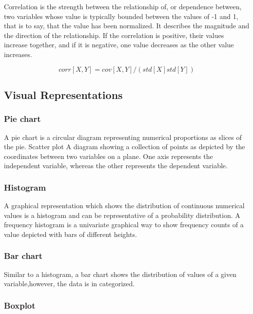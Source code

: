\documentclass[12pt,]{article}
\begin{document}
Correlation is the strength between the relationship of, or dependence
between, two variables whose value is typically bounded between the
values of -1 and 1, that is to say, that the value has been normalized.
It describes the magnitude and the direction of the relationship. If the
correlation is positive, their values increase together, and if it is
negative, one value decreases as the other value increases.

\[ corr[X,Y] = cov[X,Y] / (std[X]std[Y]) \]

\subsection{Visual Representations}\label{visual-representations}

\subsubsection{Pie chart}\label{pie-chart}

A pie chart is a circular diagram representing numerical proportions as
slices of the pie. Scatter plot A diagram showing a collection of points
as depicted by the coordinates between two variables on a plane. One
axis represents the independent variable, whereas the other represents
the dependent variable.

\subsubsection{Histogram}\label{histogram}

A graphical representation which shows the distribution of continuous
numerical values is a histogram and can be representative of a
probability distribution. A frequency histogram is a univariate
graphical way to show frequency counts of a value depicted with bars of
different heights.

\subsubsection{Bar chart}\label{bar-chart}

Similar to a histogram, a bar chart shows the distribution of values of
a given variable,however, the data is in categorized.

\subsubsection{Boxplot}\label{boxplot}
\end{document}
